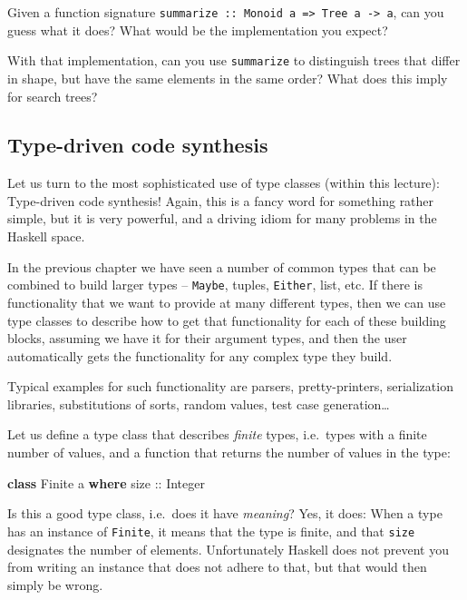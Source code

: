 \documentclass[11pt,
  american,
  DIV13]{article}
\newenvironment{Shaded}{}{}
\newcommand{\DataTypeTok}[1]{\textcolor[rgb]{0.56,0.13,0.00}{#1}}
\newcommand{\KeywordTok}[1]{\textcolor[rgb]{0.00,0.44,0.13}{\textbf{#1}}}
\newcommand{\NormalTok}[1]{#1}
\newcommand{\OtherTok}[1]{\textcolor[rgb]{0.00,0.44,0.13}{#1}}
\begin{document}
Given a function signature
\texttt{summarize\ ::\ Monoid\ a\ =\textgreater{}\ Tree\ a\ -\textgreater{}\ a},
can you guess what it does? What would be the implementation you expect?

With that implementation, can you use \texttt{summarize} to distinguish
trees that differ in shape, but have the same elements in the same
order? What does this imply for search trees?

\hypertarget{type-driven-code-synthesis}{%
\subsection{Type-driven code
synthesis}\label{type-driven-code-synthesis}}

Let us turn to the most sophisticated use of type classes (within this
lecture): Type-driven code synthesis! Again, this is a fancy word for
something rather simple, but it is very powerful, and a driving idiom
for many problems in the Haskell space.

In the previous chapter we have seen a number of common types that can
be combined to build larger types -- \texttt{Maybe}, tuples,
\texttt{Either}, list, etc. If there is functionality that we want to
provide at many different types, then we can use type classes to
describe how to get that functionality for each of these building
blocks, assuming we have it for their argument types, and then the user
automatically gets the functionality for any complex type they build.

Typical examples for such functionality are parsers, pretty-printers,
serialization libraries, substitutions of sorts, random values, test
case generation\ldots{}

Let us define a type class that describes \emph{finite} types,
i.e.~types with a finite number of values, and a function that returns
the number of values in the type:

\begin{Shaded}
\begin{Highlighting}[]
\KeywordTok{class} \DataTypeTok{Finite}\NormalTok{ a }\KeywordTok{where}
\OtherTok{    size ::} \DataTypeTok{Integer}
\end{Highlighting}
\end{Shaded}

Is this a good type class, i.e.~does it have \emph{meaning}? Yes, it
does: When a type has an instance of \texttt{Finite}, it means that the
type is finite, and that \texttt{size} designates the number of
elements. Unfortunately Haskell does not prevent you from writing an
instance that does not adhere to that, but that would then simply be
wrong.
\end{document}
